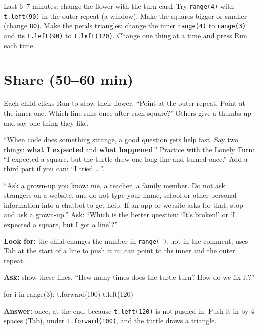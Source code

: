 \begin{freebuild}
Last 6--7 minutes: change the flower with the turn card. Try \texttt{range(4)} with \texttt{t.left(90)} in the outer repeat (a window). Make the squares bigger or smaller (change \texttt{80}). Make the petals triangles: change the inner \texttt{range(4)} to \texttt{range(3)} and its \texttt{t.left(90)} to \texttt{t.left(120)}. Change one thing at a time and press Run each time.
\end{freebuild}

\section{Share (50--60 min)}
\begin{teacherscript}
Each child clicks Run to show their flower. \enquote{Point at the outer repeat. Point at the inner one. Which line runs once after each square?} Others give a thumbs up and say one thing they like.
\end{teacherscript}

\begin{safety}
\enquote{When code does something strange, a good question gets help fast. Say two things: \textbf{what I expected} and \textbf{what happened}.} Practice with the Lonely Turn: \enquote{I expected a square, but the turtle drew one long line and turned once.} Add a third part if you can: \enquote{I tried \ldots}.

\enquote{Ask a grown-up you know: me, a teacher, a family member. Do not ask strangers on a website, and do not type your name, school or other personal information into a chatbot to get help. If an app or website asks for that, stop and ask a grown-up.} Ask: \enquote{Which is the better question: \enquote{It's broken!} or \enquote{I expected a square, but I got a line}?}
\end{safety}

\begin{formativecheck}
\textbf{Look for:} the child changes the number in \texttt{range( )}, not in the comment; uses Tab at the start of a line to push it in; can point to the inner and the outer repeat.

\textbf{Ask:} show these lines. \enquote{How many times does the turtle turn? How do we fix it?}
\begin{pycode}
for i in range(3):
    t.forward(100)
t.left(120)
\end{pycode}
\textbf{Answer:} once, at the end, because \texttt{t.left(120)} is not pushed in. Push it in by 4 spaces (Tab), under \texttt{t.forward(100)}, and the turtle draws a triangle.
\end{formativecheck}

